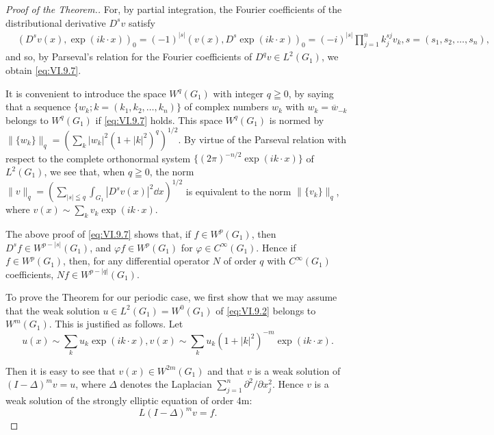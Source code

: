 \begin{proof}[Proof of the Theorem.]
For, by partial integration, the Fourier coefficients of the distributional derivative $D^s v$ satisfy 
\begin{equation}\label{eq:VI.9.8}
\begin{aligned}
&(D ^{s} v (x), \exp (i k \cdot x)) _{0}  = (- 1) ^{|s|} (v (x), D ^{s} \exp (i k \cdot x)) _{0} = (- i) ^{|s|} \prod\limits_{j=1} ^{n} k _{j} ^{sj} v _{k}, s = (s _{1}, s _{2}, \dots , s _{n}),
\end{aligned}
\end{equation}
and so, by Parseval's relation for the Fourier coefficients of $D^q v \in L^2(G_1)$, we obtain \eqref{eq:VI.9.7}. 

It is convenient to introduce the space $W^q(G_1)$ with integer $q \geqq 0$, by saying that a sequence $\{w_k; k = (k_1, k_2, \ldots, k_n)\}$ of complex numbers $w_k$ with $w_k = \overline{w}_{-k}$ belongs to $W^q(G_1)$ if \eqref{eq:VI.9.7} holds. This space $W^q(G_1)$ is normed by $\|\{w_k\}\|_q = \left(\sum\limits_k |w_k|^2 (1 + |k|^2)^q\right)^{1/2}$. By virtue of the Parseval relation with respect to the complete orthonormal system $\{(2\pi)^{-n/2} \exp(ik \cdot x)\}$ of $L^2(G_1)$, we see that, when $q \geqq 0$, the norm $\|v\|_q = \left(\sum\limits_{|s| \leqq q} \int_{G_1} |D^s v(x)|^2 \dd x\right)^{1/2}$ is equivalent to the norm $\|\{v_k\}\|_q$, where $v(x) \sim \sum\limits_k v_k \exp(ik \cdot x)$. 

The above proof of \eqref{eq:VI.9.7} shows that, if $f \in W^{p}(G_{1})$, then $D^{s}f \in W^{p-|s|}(G_{1})$, and $\varphi f \in W^{p}(G_{1})$ for $\varphi \in C^{\infty}(G_{1})$. Hence 
if $f \in W^{p}(G_{1})$, then, for any differential operator $N$ of 
order $q$ with $C^\infty (G_1)$ coefficients, $Nf\in W^{p-|q|}(G_1)$. 


To prove the Theorem for our periodic case, we first show that we may assume that the weak solution $u \in L^{2}(G_{1}) = W^{0}(G_{1})$ of \eqref{eq:VI.9.2} belongs to $W^{m}(G_{1})$. This is justified as follows. Let 
\[
u (x) \sim \sum\limits_{k} u _{k} \exp (i k \cdot x), v (x) \sim \sum\limits_{k} u _{k} (1 + | k | ^{2}) ^{-m} \exp (i k \cdot x).
\]

Then it is easy to see that $v(x) \in W^{2m}(G_1)$ and that $v$ is a weak solution of $(I - \Delta)^m v = u$, where $\Delta$ denotes the Laplacian $\sum\limits_{j=1}^{n} \partial^2 / \partial x_j^2$. Hence $v$ is a weak solution of the strongly elliptic equation of order 4m: 
\begin{equation}\tag{2'}\label{eq:VI.9.2'}
L (I - \Delta) ^{m} v = f.
\end{equation}


\end{proof}
